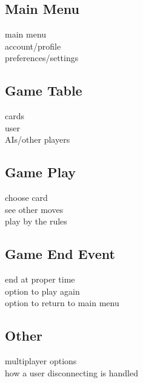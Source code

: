 \documentclass[11pt, titlepage]{article}
\begin{document}
		\subsection{Main Menu}
			main menu\\
			account/profile \\
			preferences/settings\\
		\subsection{Game Table}
			cards\\
			user\\
			AIs/other players
		\subsection{Game Play}
			choose card\\
			see other moves\\
			play by the rules
		\subsection{Game End Event}
			end at proper time\\
			option to play again\\
			option to return to main menu
		\subsection{Other}	
			multiplayer options\\
			how a user disconnecting is handled
		
\end{document}
